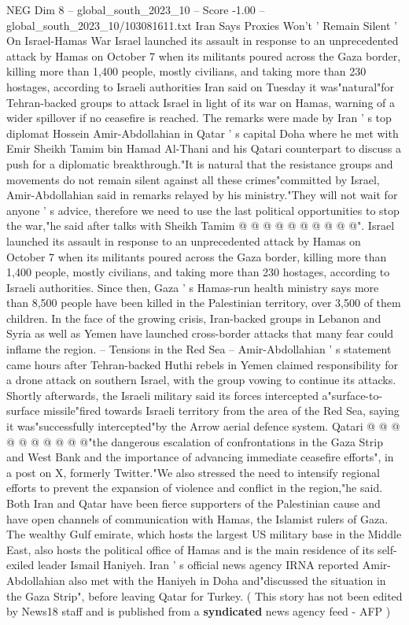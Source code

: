 \begin{textsample}{NEG Dim 8 – global\_south\_2023\_10 – Score -1.00 – global\_south\_2023\_10/103081611.txt}  \label{ex:f8_neg_089}
Iran Says Proxies Won't ' Remain Silent ' On Israel-Hamas War Israel launched its assault in response to an unprecedented attack by Hamas on October 7 when its militants poured across the Gaza border, killing more than 1,400 people, mostly civilians, and taking more than 230 hostages, according to Israeli authorities Iran said on Tuesday it was"natural"for Tehran-backed groups to attack Israel in light of its war on Hamas, warning of a wider spillover if no ceasefire is reached.
The remarks were made by Iran ' s top diplomat Hossein Amir-Abdollahian in Qatar ' s capital Doha where he met with Emir Sheikh Tamim bin Hamad Al-Thani and his Qatari counterpart to discuss a push for a diplomatic breakthrough."It is natural that the resistance groups and movements do not remain silent against all these crimes"committed by Israel, Amir-Abdollahian said in remarks relayed by his ministry."They will not wait for anyone ' s advice, therefore we need to use the last political opportunities to stop the war,"he said after talks with Sheikh Tamim @ @ @ @ @ @ @ @ @ @".
Israel launched its assault in response to an unprecedented attack by Hamas on October 7 when its militants poured across the Gaza border, killing more than 1,400 people, mostly civilians, and taking more than 230 hostages, according to Israeli authorities.
Since then, Gaza ' s Hamas-run health ministry says more than 8,500 people have been killed in the Palestinian territory, over 3,500 of them children.
In the face of the growing crisis, Iran-backed groups in Lebanon and Syria as well as Yemen have launched cross-border attacks that many fear could inflame the region. -- Tensions in the Red Sea -- Amir-Abdollahian ' s statement came hours after Tehran-backed Huthi rebels in Yemen claimed responsibility for a drone attack on southern Israel, with the group vowing to continue its attacks.
Shortly afterwards, the Israeli military said its forces intercepted a"surface-to-surface missile"fired towards Israeli territory from the area of the Red Sea, saying it was"successfully intercepted"by the Arrow aerial defence system.
Qatari @ @ @ @ @ @ @ @ @ @"the dangerous escalation of confrontations in the Gaza Strip and West Bank and the importance of advancing immediate ceasefire efforts", in a post on X, formerly Twitter."We also stressed the need to intensify regional efforts to prevent the expansion of violence and conflict in the region,"he said.
Both Iran and Qatar have been fierce supporters of the Palestinian cause and have open channels of communication with Hamas, the Islamist rulers of Gaza.
The wealthy Gulf emirate, which hosts the largest US military base in the Middle East, also hosts the political office of Hamas and is the main residence of its self-exiled leader Ismail Haniyeh.
Iran ' s official news agency IRNA reported Amir-Abdollahian also met with the Haniyeh in Doha and"discussed the situation in the Gaza Strip", before leaving Qatar for Turkey. ( This story has not been edited by News18 staff and is published from a \textbf{syndicated} news agency feed - AFP )

\end{textsample}
